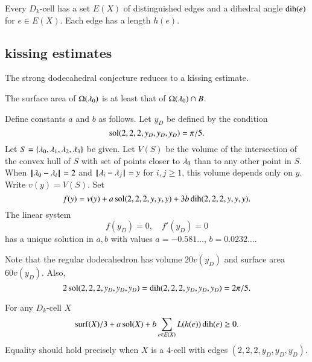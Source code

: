 Every $D_k$-cell has a set $E(X)$ of distinguished edges and a dihedral angle $\operatorname{dih}(e)$ for $e\in E(X)$.  Each edge has a length $h(e)$.
%
%
%
%

\subsection{kissing estimates}

The strong dodecahedral conjecture reduces to a kissing estimate.
%

\begin{lemma} The surface area of $\Omega(\lambda_0)$ is at least that
of $\Omega(\lambda_0)\cap B$.
\end{lemma}
%
%

\begin{definition}
Define constants $a$ and $b$ as follows.  Let $y_D$ be defined
by the condition
$$
\operatorname{sol}(2,2,2,y_D,y_D,y_D) = \pi/5.
$$
Let $S=\{\lambda_0,\lambda_1,\lambda_2,\lambda_3\}$ be given.  Let $V(S)$ be the
volume of the intersection of the convex hull of $S$ with set of points closer to $\lambda_0$ than to any other point in $S$.  When ${\hskip0.1em|\hskip-0.15em|\hskip0.1em}\lambda_0 - \lambda_i{\hskip0.1em|\hskip-0.15em|\hskip0.1em} = 2$ and ${\hskip0.1em|\hskip-0.15em|\hskip0.1em}\lambda_i - \lambda_j{\hskip0.1em|\hskip-0.15em|\hskip0.1em} = y$ for $i,j\ge 1$, this volume depends
only on $y$. Write $v(y) = V(S)$.  Set
$$
f(y) = v(y) + a \operatorname{sol}(2,2,2,y,y,y) + 3 b \operatorname{dih}(2,2,2,y,y,y).
$$
The linear system
$$
f(y_D) = 0,\quad f'(y_D) = 0
$$
has a unique solution in $a,b$ with values $a=-0.581\ldots$, $b=0.0232\ldots$.
\end{definition}
%
%
%
%
%

Note that the regular dodecahedron has volume $20 v(y_D)$ and surface area $60 v(y_D)$.  Also,
$$
2\operatorname{sol}(2,2,2,y_D,y_D,y_D) =\operatorname{dih}(2,2,2,y_D,y_D,y_D)=2\pi/5.
$$
%
%

\begin{conjecture}  For any $D_k$-cell $X$
$$
{\operatorname{surf}}(X)/3 + a \operatorname{sol}(X) + b \sum_{e\in E(X)} L(h(e)) \operatorname{dih}(e) \ge 0.
$$
Equality should hold precisely when $X$ is a $4$-cell with edges
$(2,2,2,y_D,y_D,y_D)$.
\end{conjecture}
%

